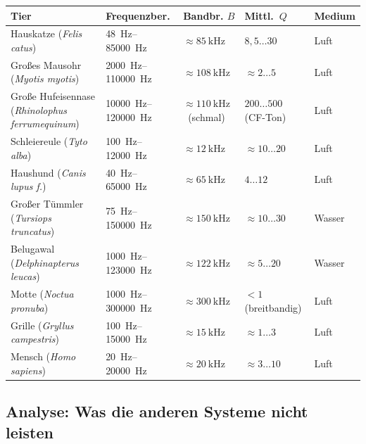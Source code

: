 ﻿\documentclass[12pt,a4paper,titlepage]{report}
\begin{document}
\begin{center}
\renewcommand{\arraystretch}{1.45}
\begin{tabular}{p{3.8cm} p{2.8cm} p{2.2cm} p{2.2cm} p{2.6cm}}
\toprule
\textbf{Tier} & \textbf{Frequenzber.} &
\textbf{Bandbr. $B$} & \textbf{Mittl.\ $Q$} & \textbf{Medium} \\
\midrule
Hauskatze (\textit{Felis catus})
  & \SIrange{48}{85000}{\hertz}
  & $\approx \SI{85}{\kilo\hertz}$
  & $8{,}5 \ldots 30$
  & Luft \\
Großes Mausohr (\textit{Myotis myotis})
  & \SIrange{2000}{110000}{\hertz}
  & $\approx \SI{108}{\kilo\hertz}$
  & $\approx 2 \ldots 5$
  & Luft \\
Große Hufeisennase (\textit{Rhinolophus ferrumequinum})
  & \SIrange{10000}{120000}{\hertz}
  & $\approx \SI{110}{\kilo\hertz}$\ (schmal)
  & $200 \ldots 500$ (CF-Ton)
  & Luft \\
Schleiereule (\textit{Tyto alba})
  & \SIrange{100}{12000}{\hertz}
  & $\approx \SI{12}{\kilo\hertz}$
  & $\approx 10 \ldots 20$
  & Luft \\
Haushund (\textit{Canis lupus f.})
  & \SIrange{40}{65000}{\hertz}
  & $\approx \SI{65}{\kilo\hertz}$
  & $4 \ldots 12$
  & Luft \\
Großer Tümmler (\textit{Tursiops truncatus})
  & \SIrange{75}{150000}{\hertz}
  & $\approx \SI{150}{\kilo\hertz}$
  & $\approx 10 \ldots 30$
  & Wasser \\
Belugawal (\textit{Delphinapterus leucas})
  & \SIrange{1000}{123000}{\hertz}
  & $\approx \SI{122}{\kilo\hertz}$
  & $\approx 5 \ldots 20$
  & Wasser \\
Motte (\textit{Noctua pronuba})
  & \SIrange{1000}{300000}{\hertz}
  & $\approx \SI{300}{\kilo\hertz}$
  & $< 1$ (breitbandig)
  & Luft \\
Grille (\textit{Gryllus campestris})
  & \SIrange{100}{15000}{\hertz}
  & $\approx \SI{15}{\kilo\hertz}$
  & $\approx 1 \ldots 3$
  & Luft \\
Mensch (\textit{Homo sapiens})
  & \SIrange{20}{20000}{\hertz}
  & $\approx \SI{20}{\kilo\hertz}$
  & $\approx 3 \ldots 10$
  & Luft \\
\bottomrule
\end{tabular}
\end{center}

\subsection{Analyse: Was die anderen Systeme nicht leisten}
\end{document}
